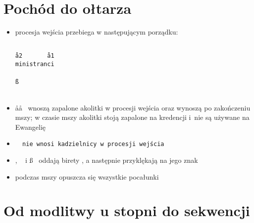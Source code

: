 \section{Pochód do ołtarza}

\begin{itemize}
	\item procesja wejścia przebiega w następującym porządku:
		\begin{center}
			\tt~~~ \\
			\aa2 ~~  ~~ \aa1\\
			ministranci\\
			 \\
			\ss \\
			\dd \\
			\ii 
		\end{center}
    \item \aa\aa~ wnoszą zapalone akolitki w procesji wejścia oraz wynoszą po
	    zakończeniu mszy; w czasie mszy akolitki stoją zapalone na
	    kredencji i nie są używane na Ewangelię
    \item \tt~ nie wnosi kadzielnicy w procesji wejścia
    \item \ii, \dd~ i \ss~ oddają birety , a następnie przyklękają na jego znak
    \item podczas mszy opuszcza się wszystkie pocałunki
\end{itemize}

\section{Od modlitwy u stopni do sekwencji}

